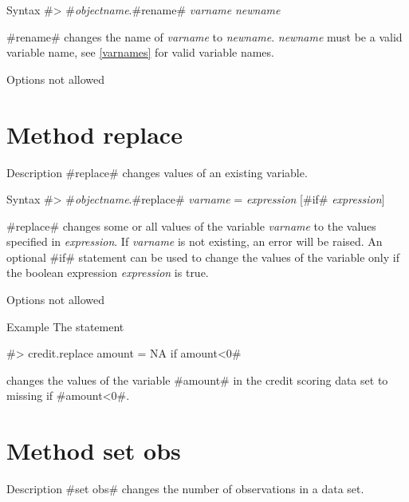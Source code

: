 \begin{stanza}{Syntax}
#> #{\em objectname}.#rename# {\em varname} {\em newname}

#rename# changes the name of {\em varname} to {\em newname}. {\em newname} must be a valid variable name, see \autoref{varnames} for valid variable names.
\end{stanza}

\begin{stanza}{Options}
not allowed
\end{stanza}


\section{Method replace}
 \label{replace} 

\begin{stanza}{Description}
 #replace# changes values of an existing variable.
\end{stanza}

\begin{stanza}{Syntax}
 #> #{\em objectname}.#replace# {\em varname} = {\em expression} [#if# {\em expression}]

#replace# changes some or all values of the variable {\em varname} to the values specified in {\em expression}. If {\em varname} is not existing, an error will be raised. An optional #if# statement can be used to change the values of the variable only if the boolean expression {\em expression} is true.
\end{stanza}

\begin{stanza}{Options}
not allowed
\end{stanza}

\begin{stanza}{Example}
The statement

#> credit.replace amount = NA if amount<0#

changes the values of the variable #amount# in the credit scoring data set to missing if #amount<0#.
\end{stanza}


\section{Method set obs}
 \label{setobs}

\begin{stanza}{Description}
 #set obs# changes the number of observations in a data set.
\end{stanza}

